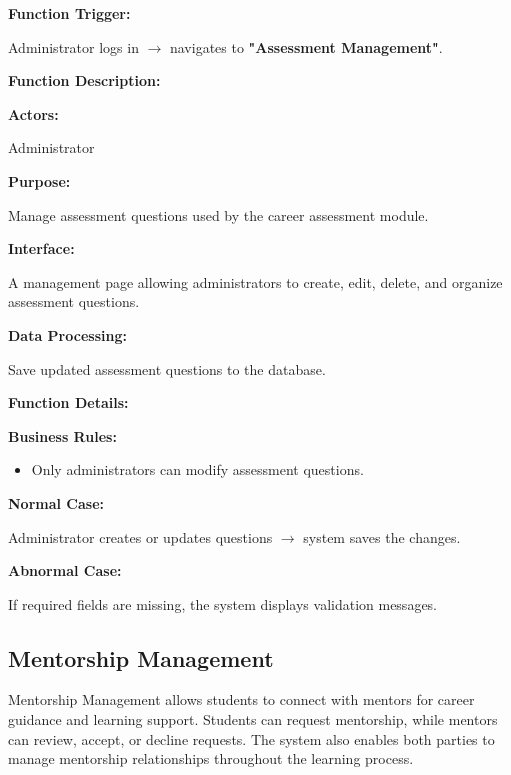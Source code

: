 \textbf{Function Trigger:}

Administrator logs in $\rightarrow$ navigates to \textbf{"Assessment Management"}.

\vspace{0.3cm}

\textbf{Function Description:}

\textbf{Actors:}

Administrator

\vspace{0.2cm}

\textbf{Purpose:}

Manage assessment questions used by the career assessment module.

\vspace{0.2cm}

\textbf{Interface:}

A management page allowing administrators to create, edit, delete, and organize assessment questions.

\vspace{0.2cm}

\textbf{Data Processing:}

Save updated assessment questions to the database.

\vspace{0.3cm}

\textbf{Function Details:}

\textbf{Business Rules:}

\begin{itemize}
\item Only administrators can modify assessment questions.
\end{itemize}

\textbf{Normal Case:}

Administrator creates or updates questions $\rightarrow$ system saves the changes.

\textbf{Abnormal Case:}

If required fields are missing, the system displays validation messages.


\subsection{Mentorship Management}

Mentorship Management allows students to connect with mentors for career guidance and learning support. Students can request mentorship, while mentors can review, accept, or decline requests. The system also enables both parties to manage mentorship relationships throughout the learning process.

